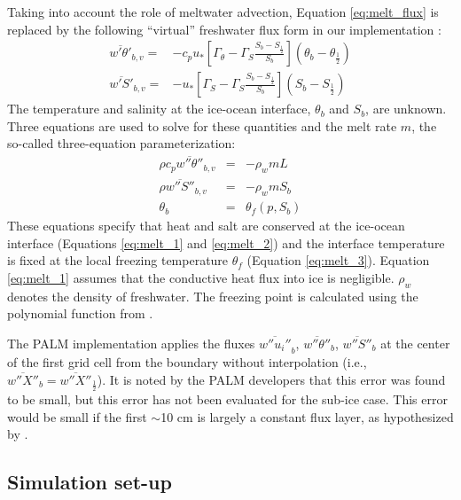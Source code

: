 \documentclass[draft]{agujournal2019}
\begin{document}
Taking into account the role of meltwater advection, Equation \ref{eq:melt_flux} is replaced by the following ``virtual'' freshwater flux form in our implementation \cite{jenkins_role_2001, asay-davis_experimental_2016}:
\begin{eqnarray}
    \overline{w'\theta'}_{b,v} =& -c_p u_*
    \left[\Gamma_{\theta} - \Gamma_S \frac{S_b - S_{\frac{1}{2}}}{S_b}\right]\left(\theta_b-\theta_{\frac{1}{2}}\right) \label{eq:vflux_heat}\\
    \overline{w'S'}_{b,v} =& -u_*
    \left[\Gamma_S - \Gamma_S \frac{S_b - S_{\frac{1}{2}}}{S_b}\right]\left(S_b-S_{\frac{1}{2}}\right) \label{eq:vflux_salt}
\end{eqnarray}
%
The temperature and salinity at the ice-ocean interface, $\theta_b$ and $S_b$, are unknown. Three equations are used to solve for these quantities and the melt rate $m$, the so-called three-equation parameterization:
%
\begin{eqnarray}
    \rho c_p \overline{w''\theta''}_{b,v} &=& -\rho_w m L \label{eq:melt_1}\\
    \rho \overline{w''S''}_{b,v} &=& −\rho_w m S_b \label{eq:melt_2}\\
    \theta_b &=& \theta_f(p,S_b) \label{eq:melt_3}
\end{eqnarray}
%
These equations specify that heat and salt are conserved at the ice-ocean interface (Equations \ref{eq:melt_1} and \ref{eq:melt_2}) and the interface temperature is fixed at the local freezing temperature $\theta_f$ (Equation \ref{eq:melt_3}). Equation \ref{eq:melt_1} assumes that the conductive heat flux into ice is negligible. $\rho_w$ denotes the density of freshwater. The freezing point is calculated using the polynomial function from .

The PALM implementation applies the fluxes $\overline{w''u_i''}_b$, $\overline{w''\theta''}_b$, $\overline{w''S''}_b$ at the center of the first grid cell from the boundary without interpolation (i.e., $\overline{w''X''}_b = \overline{w''X''}_{\frac{1}{2}}$). It is noted by the PALM developers that this error was found to be small, but this error has not been evaluated for the sub-ice case. This error would be small if the first $\sim$10 cm is largely a constant flux layer, as hypothesized by . 


\subsection{Simulation set-up}\label{meth:setup}
\end{document}
